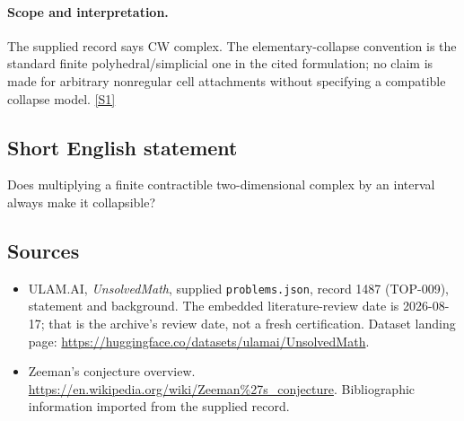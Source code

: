 \documentclass[11pt,a4paper]{article}
\newcommand{\sref}[2]{\hyperlink{source:#1:#2}{[S#2]}}
\begin{document}
\paragraph{Scope and interpretation.}

The supplied record says CW complex. The elementary-collapse convention is the standard finite polyhedral/simplicial one in the cited formulation; no claim is made for arbitrary nonregular cell attachments without specifying a compatible collapse model. \sref{1487}{1}

\subsection{Short English statement}

Does multiplying a finite contractible two-dimensional complex by an interval always make it collapsible?

\subsection{Sources}

{\small

\begin{itemize}

\item[\hypertarget{source:1487:1}{S1}] ULAM.AI, \emph{UnsolvedMath}, supplied \texttt{problems.json}, record 1487 (TOP-009), statement and background. The embedded literature-review date is 2026-08-17; that is the archive’s review date, not a fresh certification. Dataset landing page: \url{https://huggingface.co/datasets/ulamai/UnsolvedMath}.

\item[\hypertarget{source:1487:2}{S2}] Zeeman's conjecture overview. \url{https://en.wikipedia.org/wiki/Zeeman%27s_conjecture}. Bibliographic information imported from the supplied record.

\end{itemize}

}

\label{end:1487}
\end{document}
